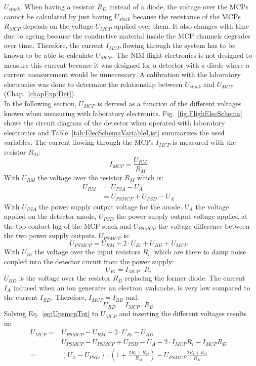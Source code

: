 $U_{stack}$. When having a resistor $R_D$ instead of a diode, the voltage over the MCPs cannot be calculated by just having $U_{stack}$ because the resistance of the MCPs $R_{MCP}$ depends on the voltage $U_{MCP}$ applied over them. It also changes with time due to ageing because the conductive material inside the MCP channels degrades over time. Therefore, the current $I_{MCP}$ flowing through the system has to be known to be able to calculate $U_{MCP}$. The NIM flight electronics is not designed to measure this current because it was designed for a detector with a diode where a current measurement would be unnecessary. A calibration with the laboratory electronics was done to determine the relationship between $U_{stack}$ and $U_{MCP}$ (Chap.~\ref{chapExp:Det}).\\
	In the following section, $U_{MCP}$ is derived as a function of the different voltages known when measuring with laboratory electronics. Fig.~\ref{fig:FlighElecSchema} shows the circuit diagram of the detector when operated with laboratory electronics and Table~\ref{tab:ElecSchemaVariableList} summarizes the used variables. The current flowing through the MCPs $I_{MCP}$ is measured with the resistor $R_M$:
	\begin{equation}
		I_{MCP} = \frac{U_{RM}}{R_{M}}
	\end{equation}
	With $U_{RM}$ the voltage over the resistor $R_{M}$ which is:
	\begin{align}
		U_{RM} &= U_{PSA} - U_{A}\\
			   &= U_{PSMCP} + U_{PSD} - U_A
	\end{align}
	With $U_{PSA}$ the power supply output voltage for the anode, $U_{A}$ the voltage applied on the detector anode, $U_{PSD}$ the power supply output voltage applied at the top contact lug of the MCP stack and $U_{PSMCP}$ the voltage difference between the two power supply outputs. $U_{PSMCP}$ is:
	\begin{equation}
		U_{PSMCP} = U_{RM} + 2\cdot U_{Ri} + U_{RD} + U_{MCP}
		\label{eq:UpsmcpTot}
	\end{equation}
	With $U_{Ri}$ the voltage over the input resistors $R_i$, which are there to damp noise coupled into the detector circuit from the power supply:
	\begin{equation}
		U_{Ri} = I_{MCP}\cdot R_i
	\end{equation} 
	$U_{RD}$ is the voltage over the resistor $R_D$ replacing the former diode. The current $I_A$ induced when an ion generates an electron avalanche, is very low compared to the current $I_{RD}$. Therefore, $I_{MCP} = I_{RD}$ and:
	\begin{equation}
		U_{RD} = I_{MCP}\cdot R_D
	\end{equation}
	Solving Eq.~\eqref{eq:UpsmcpTot} to $U_{MCP}$ and inserting the different voltages results in:
	\begin{align}
		U_{MCP} =& U_{PSMCP} - U_{RM} - 2\cdot U_{Ri} - U_{RD}\\
				=& U_{PSMCP} - U_{PSMCP} + U_{PSD} - U_A - 2\cdot I_{MCP} R_i - I_{MCP} R_D\\
				=& (U_A - U_{PSD})\cdot(1 + \frac{2R_i + R_D}{R_M}) - U_{PSMCP}\frac{2R_i + R_D}{R_M}
	\end{align}	
	
